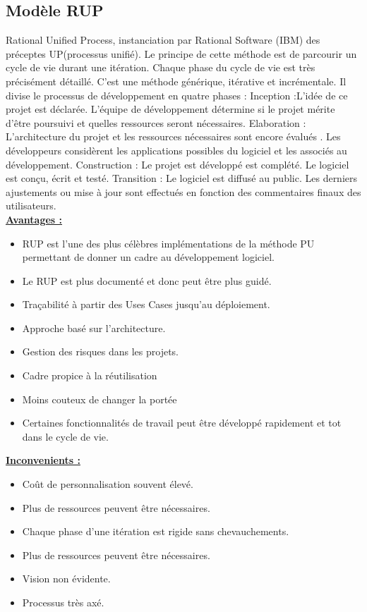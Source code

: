 \documentclass[11pt,a4paper,oneside]{book}
\begin{document}
	\subsection{Modèle RUP}
	Rational Unified Process, instanciation par Rational Software (IBM) des préceptes UP(processus unifié). Le principe de cette méthode est de parcourir un cycle de vie durant une itération. Chaque phase du cycle de vie est très précisément détaillé. C’est une méthode générique, itérative et incrémentale. Il divise le processus de développement en quatre phases :
	Inception :L'idée de ce projet est déclarée. L’équipe de développement détermine si le projet
	mérite d'être poursuivi et quelles ressources seront nécessaires.
	Elaboration : L’architecture du projet et les ressources nécessaires sont encore évalués .
	Les développeurs considèrent les applications possibles du logiciel et les associés au développement.
	Construction : Le projet est développé est complété. Le logiciel est conçu, écrit et testé.
	Transition : Le logiciel est diffusé au public. Les derniers ajustements ou mise à jour sont effectués en fonction des commentaires finaux des utilisateurs.\\
	\underline{\textbf{Avantages :}}
	\begin{itemize}
		\item RUP est l’une des plus célèbres implémentations de la méthode PU permettant de donner un cadre au développement logiciel.
		\item Le RUP est plus documenté et donc peut être plus guidé.
		\item Traçabilité à partir des Uses Cases jusqu’au déploiement.
		\item Approche basé sur l’architecture.
		\item Gestion des risques dans les projets.
		\item Cadre propice à la réutilisation
		\item Moins couteux de changer la portée
		\item Certaines fonctionnalités de travail peut être développé rapidement et tot dans le cycle de vie.
	\end{itemize}
	\underline{\textbf{Inconvenients :}}
	\begin{itemize}
		\item Coût de personnalisation souvent élevé.
		\item Plus de ressources peuvent être nécessaires.
		\item Chaque phase d’une itération est rigide sans chevauchements.
		\item Plus de ressources peuvent être nécessaires.
		\item Vision non évidente.
		\item Processus très axé.
	\end{itemize}
	
\end{document}
